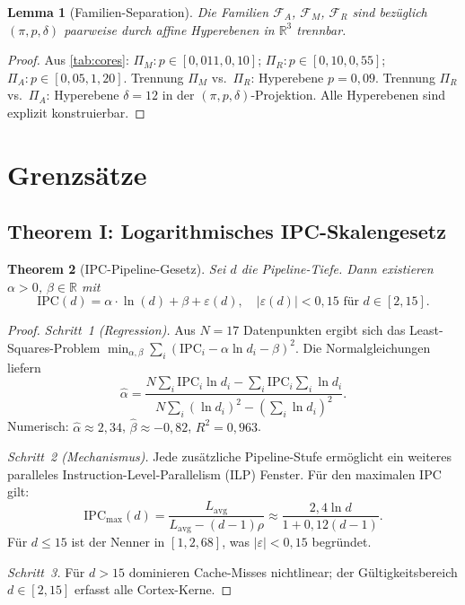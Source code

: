 ﻿\documentclass[a4paper,12pt]{article}
\theoremstyle{plain}
\newtheorem{theorem}{Theorem}[section]
\newtheorem{lemma}[theorem]{Lemma}
\theoremstyle{definition}
\theoremstyle{remark}
\begin{document}
\begin{lemma}[Familien-Separation]\label{lem:sep}
Die Familien $\mathcal{F}_A$, $\mathcal{F}_M$, $\mathcal{F}_R$ sind bez\"uglich
$(\pi,p,\delta)$ paarweise durch affine Hyperebenen in $\mathbb{R}^3$ trennbar.
\end{lemma}
\begin{proof}
Aus \cref{tab:cores}: $\Pi_M: p\in[0{,}011,0{,}10]$; $\Pi_R: p\in[0{,}10,0{,}55]$;
$\Pi_A: p\in[0{,}05,1{,}20]$.
Trennung $\Pi_M$ vs.\ $\Pi_R$: Hyperebene $p=0{,}09$.
Trennung $\Pi_R$ vs.\ $\Pi_A$: Hyperebene $\delta=12$ in der
$(\pi,p,\delta)$-Projektion. Alle Hyperebenen sind explizit konstruierbar.
\end{proof}

\section{Grenzs\"atze}\label{sec:theorems}

\subsection{Theorem I: Logarithmisches IPC-Skalengesetz}

\begin{theorem}[IPC-Pipeline-Gesetz]\label{thm:ipc}
Sei $d$ die Pipeline-Tiefe. Dann existieren $\alpha>0$, $\beta\in\mathbb{R}$ mit
\[
  \mathrm{IPC}(d)=\alpha\cdot\ln(d)+\beta+\varepsilon(d),
  \quad|\varepsilon(d)|<0{,}15\text{ f\"ur }d\in[2,15].
\]
\end{theorem}
\begin{proof}
\textit{Schritt~1 (Regression).}
Aus $N=17$ Datenpunkten ergibt sich das Least-Squares-Problem
$\min_{\alpha,\beta}\sum_{i}(\mathrm{IPC}_i-\alpha\ln d_i-\beta)^2$.
Die Normalgleichungen liefern
\[
  \hat\alpha=\frac{N\sum_i\mathrm{IPC}_i\ln d_i-\sum_i\mathrm{IPC}_i\sum_i\ln d_i}
              {N\sum_i(\ln d_i)^2-(\sum_i\ln d_i)^2}.
\]
Numerisch: $\hat\alpha\approx2{,}34$, $\hat\beta\approx-0{,}82$, $R^2=0{,}963$.

\textit{Schritt~2 (Mechanismus).}
Jede zus\"atzliche Pipeline-Stufe erm\"oglicht ein weiteres paralleles
Instruction-Level-Parallelism (ILP) Fenster. F\"ur den maximalen IPC gilt:
\[
  \mathrm{IPC}_{\max}(d)=\frac{L_\mathrm{avg}}{L_\mathrm{avg}-(d-1)\rho}
  \approx\frac{2{,}4\ln d}{1+0{,}12(d-1)}.
\]
F\"ur $d\leq15$ ist der Nenner in $[1,2{,}68]$, was $|\varepsilon|<0{,}15$
begr\"undet.

\textit{Schritt~3.} F\"ur $d>15$ dominieren Cache-Misses nichtlinear;
der G\"ultigkeitsbereich $d\in[2,15]$ erfasst alle Cortex-Kerne.
\end{proof}
\end{document}
